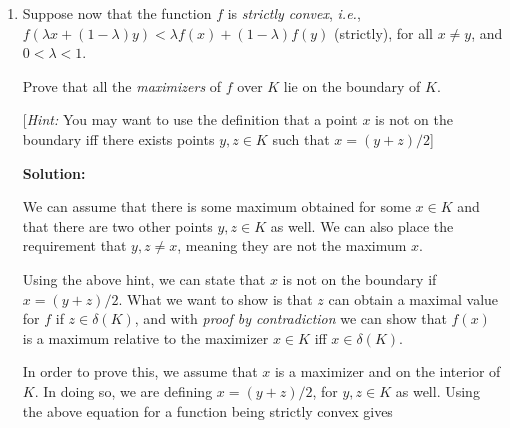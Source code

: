 \documentclass[12pt]{article}
\newcommand{\inner}[2]{\left< #1 , #2\right>}
\newcommand{\grad}{\nabla}
\begin{document}
\begin{enumerate}
\begin{enumerate}
      {\bf Solution:}

Given the following in the above equation

\begin{align*}
\inner{\nabla f(x)}{x - x^{*}} &> 0\\
\intertext{If a function is convex, then we have the following is greater than or equal to the previous. As it is greater than or equal to, we can leave the greater than sign}
f(x^{*}) - f(x) &> 0\\
\intertext{In order to minimize, we need to take the gradient, giving}
\grad f(x^{*}) - \grad f(x) &> 0\\
\intertext{If $x^{*}$ is the minimizer, then the gradient is zero, giving}
-\grad f(x) &> 0\\
\intertext{If $f$ is a convex function, then any point $x \neq x^{*}$ has a negative slope/gradient, meaning the above holds true, thus proving the proposed statement.}
\end{align*}


    \item Suppose now that the function $f$ is {\em strictly convex}, {\em i.e.}, $f(\lambda x + (1 - \lambda)y) < \lambda f(x) + (1 - \lambda) f(y)$ (strictly), for all $x \neq y$, and $0 < \lambda < 1$. 

Prove that all the {\em maximizers} of $f$ over $K$ lie on the boundary of $K$. 

[{\em Hint:} You may want to use the definition that a point $x$ is not on the boundary iff there exists points $y,z \in K$ such that $x = (y+z)/2$]

      {\bf Solution:}

We can assume that there is some maximum obtained for some $x \in K$ and that there are two other points $y, z \in K$ as well. We can also place the requirement that $y, z \neq x$, meaning they are not the maximum $x$.

Using the above hint, we can state that $x$ is not on the boundary if $x = (y + z)/2$. What we want to show is that $z$ can obtain a maximal value for $f$ if $z \in \delta (K)$, and with {\em proof by contradiction} we can show that $f(x)$ is a maximum relative to the maximizer $x \in K$ iff $x \in \delta (K)$. 

In order to prove this, we assume that $x$ is a maximizer and on the interior of $K$. In doing so, we are defining $x = (y+z)/2$, for $y,z \in K$ as well. Using the above equation for a function being strictly convex gives


\end{enumerate}
\end{enumerate}
\end{document}
